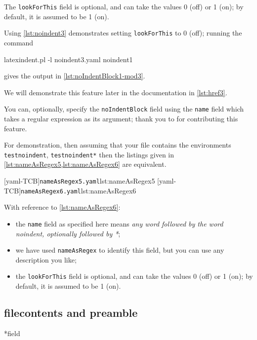 	The \texttt{lookForThis} field is optional, and can take the values 0 (off) or 1 (on); by
	default, it is assumed to be 1 (on).

	Using \cref{lst:noindent3} demonstrates setting \texttt{lookForThis} to 0 (off); running
	the command
	\begin{commandshell}
latexindent.pl -l noindent3.yaml noindent1
\end{commandshell}
	gives the output in \cref{lst:noIndentBlock1-mod3}.


	We will demonstrate this feature later in the documentation in \cref{lst:href3}.

	You can, optionally, specify
	 the
	\texttt{noIndentBlock} field using the \texttt{name} field which takes a regular
	expression as its argument; thank you to \cite{XuehaiPan} for contributing this feature.

	For demonstration, then assuming that your file contains the environments
	\texttt{testnoindent}, \texttt{testnoindent*} then the listings given in
	\cref{lst:nameAsRegex5,lst:nameAsRegex6} are equivalent.

	\begin{widepage}
		\begin{cmhtcbraster}[raster column skip=.1\linewidth]
			[yaml-TCB]{\texttt{nameAsRegex5.yaml}}{lst:nameAsRegex5}
			[yaml-TCB]{\texttt{nameAsRegex6.yaml}}{lst:nameAsRegex6}
		\end{cmhtcbraster}
	\end{widepage}

	With reference to \cref{lst:nameAsRegex6}:
	\begin{itemize}
		\item the \texttt{name} field as specified here means \emph{any word followed by the word
			      noindent, optionally followed by *};
		\item we have used \texttt{nameAsRegex} to identify this field, but you can use any description
		      you like;
		\item the \texttt{lookForThis} field is optional, and can take the values 0 (off) or 1 (on); by
		      default, it is assumed to be 1 (on).
	\end{itemize}
\subsection{filecontents and preamble}
*{field}

